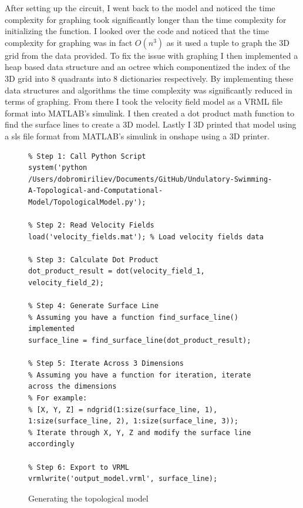 \newpage


After setting up the circuit, I went back to the model and noticed the time complexity for graphing took significantly longer than the time complexity for initializing the function. I looked over the code and noticed that the time complexity for graphing was in fact $O(n^3)$ as it used a tuple to graph the 3D grid from the data provided. To fix the issue with graphing I then implemented a heap based data structure and an octree which componentized the index of the 3D grid into 8 quadrants into 8 dictionaries respectively. By implementing these data structures and algorithms the time complexity was significantly reduced in terms of graphing. From there I took the velocity field model as a VRML file format into MATLAB's simulink. I then created a dot product math function to find the surface lines to create a 3D model. Lastly I 3D printed that model using a sls file format from MATLAB's simulink in onshape using a 3D printer.

\newpage
\begin{figure}[!ht]
\begin{verbatim}
% Step 1: Call Python Script
system('python /Users/dobromiriliev/Documents/GitHub/Undulatory-Swimming-A-Topological-and-Computational-Model/TopologicalModel.py');

% Step 2: Read Velocity Fields
load('velocity_fields.mat'); % Load velocity fields data

% Step 3: Calculate Dot Product
dot_product_result = dot(velocity_field_1, velocity_field_2);

% Step 4: Generate Surface Line
% Assuming you have a function find_surface_line() implemented
surface_line = find_surface_line(dot_product_result);

% Step 5: Iterate Across 3 Dimensions
% Assuming you have a function for iteration, iterate across the dimensions
% For example:
% [X, Y, Z] = ndgrid(1:size(surface_line, 1), 1:size(surface_line, 2), 1:size(surface_line, 3));
% Iterate through X, Y, Z and modify the surface line accordingly

% Step 6: Export to VRML
vrmlwrite('output_model.vrml', surface_line);
\end{verbatim}
\caption{Generating the topological model}\label{code:GTM}
\end{figure}
\newpage


